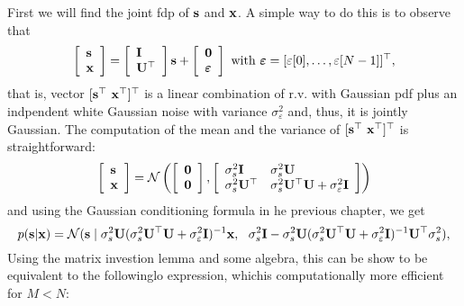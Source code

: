 First we will find the joint fdp of ${\mathbf s}$ and ${\mathbf x}$. A simple way to do this is to observe that
\begin{equation}
\left[\begin{array}{l} {\mathbf s} \\ {\mathbf x} \\ \end{array}\right] =
\left[\begin{array}{l} {\mathbf I} \\ {\mathbf U}^\top \\ \end{array}\right] {\mathbf s} + 
\left[\begin{array}{l} \bf 0 \\ {\boldsymbol \varepsilon} \\ \end{array}\right]
\text{  with  }
{\boldsymbol \varepsilon}  = [\varepsilon[0],\ldots,\varepsilon[N-1]]^\top,
\end{equation}
%
that is, vector $[{\mathbf s}^\top~{\mathbf x}^\top]^\top$ is a linear combination of r.v. with Gaussian pdf plus an indpendent white Gaussian noise with variance $\sigma_\varepsilon^2$ and, thus, it is jointly Gaussian. The computation of the mean and the variance of $[{\mathbf s}^\top~{\mathbf x}^\top]^\top$ is straightforward:
%
\begin{equation}
\left[\begin{array}{l} {\mathbf s} \\ {\mathbf x} \end{array}\right]
    = {\mathcal N}\left(
    	\left[\begin{array}{l}  \bf 0 \\ \bf 0 \end{array}\right],
        \left[\begin{array}{ll} \sigma_s^2{\mathbf I}     & \sigma_s^2{\mathbf U} \\
                                \sigma_s^2{\mathbf U}^\top & \sigma_s^2{\mathbf U}^\top{\mathbf U} + 
                                                     \sigma_\varepsilon^2 {\mathbf I}
              \end{array}\right] \right)
\label{eq:jointsx}
\end{equation}
and using the Gaussian conditioning formula in he previous chapter, we get
\begin{equation}
p({\mathbf s}|{\mathbf x}) 
	= {\mathcal N}({\mathbf s} \mid \sigma_s^2 {\mathbf U}(\sigma_s^2{\mathbf U}^\top{\mathbf U} + \sigma_\varepsilon^2{\mathbf I})^{-1} {\mathbf x},~~
\sigma_s^2{\mathbf I} - \sigma_s^2{\mathbf U}(\sigma_s^2{\mathbf U}^\top{\mathbf U} + \sigma_\varepsilon^2{\mathbf I})^{-1} {\mathbf U}^\top \sigma_s^2
) ,
\end{equation}
%
Using the matrix investion lemma and some algebra, this can be show to be equivalent to the followinglo expression, whichis computationally more efficient for $M<N$:
